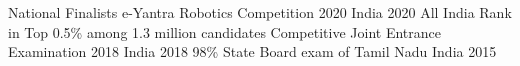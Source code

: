 


\begin{cvhonors}

  \cvhonor
    {National Finalists} %
    {e-Yantra Robotics Competition 2020} %
    {India} %
    {2020} %
  \cvhonor
    {All India Rank in Top 0.5\% among 1.3 million candidates} %
    {Competitive Joint Entrance Examination 2018} %
    {India} %
    {2018} %
  \cvhonor
    {98\%} %
    {State Board exam of Tamil Nadu} %
    {India} %
    {2015} %
\end{cvhonors}
